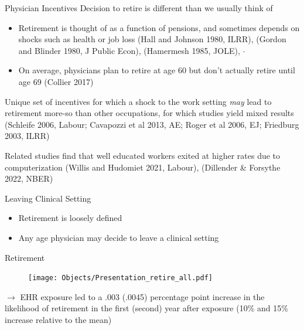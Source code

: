 \documentclass[10pt]{beamer}
\begin{document}
\begin{frame}{Physician Incentives}
Decision to retire is different than we usually think of
\vspace{3mm}
    \begin{itemize}
        \item Retirement is thought of as a function of pensions, and sometimes depends on shocks such as health or job loss
        \tiny (Hall and Johnson 1980, ILRR), (Gordon and Blinder 1980, J Public Econ), (Hamermesh 1985, JOLE), $\cdot$
        
        \vspace{3mm}
    
        \normalsize \item On average, physicians plan to retire at age 60 but don't actually retire until age 69 \tiny(Collier 2017)
    \end{itemize}
    
\vspace{3mm}
\pause

\normalsize Unique set of incentives for which a shock to the work setting \textit{may} lead to retirement more-so than other occupations, for which studies yield mixed results  \tiny (Schleife 2006, Labour; Cavapozzi et al 2013, AE; Roger et al 2006, EJ; Friedburg 2003, ILRR)

\vspace{3mm}
\pause

\normalsize Related studies find that well educated workers exited at higher rates due to computerization \tiny (Willis and Hudomiet 2021, Labour), (Dillender \& Forsythe 2022, NBER)
\end{frame}



\begin{frame}{Leaving Clinical Setting}
    \begin{itemize}
        \item Retirement is loosely defined
        \vspace{5mm}
        \item Any age physician may decide to leave a clinical setting
    \end{itemize}
\end{frame}

\begin{frame}{Retirement}
\begin{figure}[ht]
    \centering
    \texttt{[image: Objects/Presentation\_retire\_all.pdf]}
\end{figure}
$\rightarrow$ EHR exposure led to a .003 (.0045) percentage point increase in the likelihood of retirement in the first (second) year after exposure (10\% and 15\% increase relative to the mean)
\end{frame}
\end{document}

